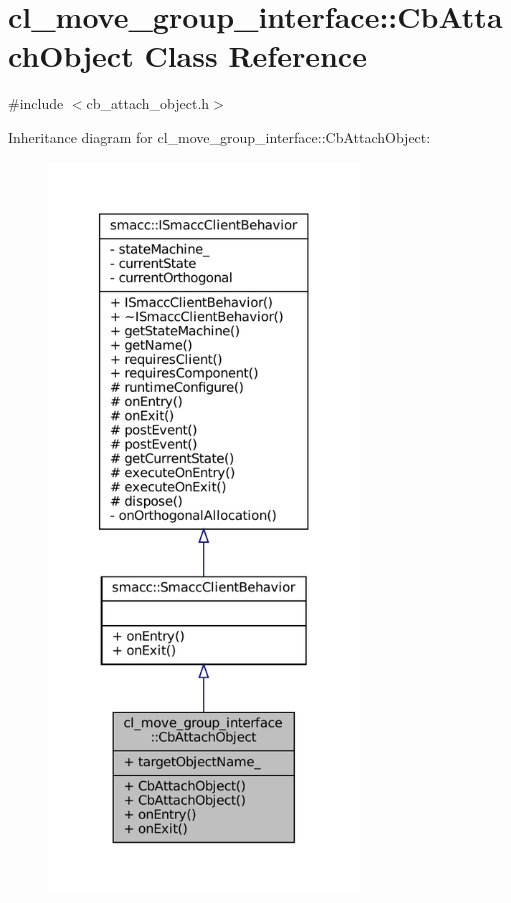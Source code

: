 \hypertarget{classcl__move__group__interface_1_1CbAttachObject}{}\section{cl\+\_\+move\+\_\+group\+\_\+interface\+:\+:Cb\+Attach\+Object Class Reference}
\label{classcl__move__group__interface_1_1CbAttachObject}


{\ttfamily \#include $<$cb\+\_\+attach\+\_\+object.\+h$>$}



Inheritance diagram for cl\+\_\+move\+\_\+group\+\_\+interface\+:\+:Cb\+Attach\+Object\+:
\nopagebreak
\begin{figure}[H]
\begin{center}
\leavevmode
\includegraphics[height=550pt]{classcl__move__group__interface_1_1CbAttachObject__inherit__graph}
\end{center}
\end{figure}


